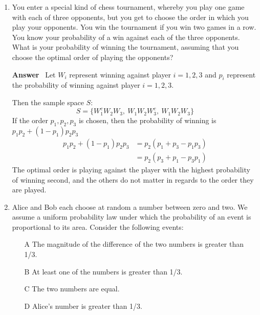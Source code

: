 \documentclass[paper=usletter, fontsize=12pt]{article}
\newcommand{\ans}{\textbf{Answer} \ }
\begin{document}
\begin{enumerate}
        \item You enter a special kind of chess tournament, whereby you play
        one game with each of three opponents, but you get to choose the order
        in which you play your opponents. You win the tournament if you win two
        games in a row. You know your probability of a win against each of the
        three opponents. What is your probability of winning the tournament,
        assuming that you choose the optimal order of playing the opponents?

        \ans Let $W_i$ represent winning against player $i = 1, 2, 3$ and $p_i$
        represent the probability of winning against player $i = 1, 2, 3$.

        Then the sample space $S$:
            \[ S = \{ W_{1}^{c}W_{2}W_{3}, \ W_{1}W_{2}W_{3}^{c}, \
            W_{1}W_{2}W_{3} \} \]
        If the order $p_1, p_2, p_3$ is chosen, then the probability of winning
        is $p_1p_2+(1-p_1)p_2p_3$
        \begin{align*}
            p_1p_2+(1-p_1)p_2p_3 & = p_2(p_1 + p_3 - p_1p_3) \\
            & = p_2(p_3 + p_1 - p_3p_1)
        \end{align*}
        The optimal order is playing against the player with the highest
        probability of winning second, and the others do not matter in regards
        to the order they are played.

        \item Alice and Bob each choose at random a number between zero and
        two. We assume a uniform probability law under which the probability of
        an event is proportional to its area. Consider the following events:

            \begin{itemize}

                \item[A] The magnitude of the difference of the two numbers is
                greater than 1/3.

                \item[B] At least one of the numbers is greater than 1/3.

                \item[C] The two numbers are equal.

                \item[D] Alice's number is greater than 1/3.

            \end{itemize}


\end{enumerate}
\end{document}
